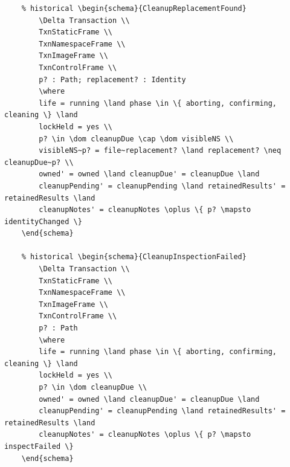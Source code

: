 \documentclass{article}
\begin{document}
\begin{verbatim}
	% historical \begin{schema}{CleanupReplacementFound}
		\Delta Transaction \\
		TxnStaticFrame \\
		TxnNamespaceFrame \\
		TxnImageFrame \\
		TxnControlFrame \\
		p? : Path; replacement? : Identity
		\where
		life = running \land phase \in \{ aborting, confirming, cleaning \} \land
		lockHeld = yes \\
		p? \in \dom cleanupDue \cap \dom visibleNS \\
		visibleNS~p? = file~replacement? \land replacement? \neq cleanupDue~p? \\
		owned' = owned \land cleanupDue' = cleanupDue \land
		cleanupPending' = cleanupPending \land retainedResults' = retainedResults \land
		cleanupNotes' = cleanupNotes \oplus \{ p? \mapsto identityChanged \}
	\end{schema}

	% historical \begin{schema}{CleanupInspectionFailed}
		\Delta Transaction \\
		TxnStaticFrame \\
		TxnNamespaceFrame \\
		TxnImageFrame \\
		TxnControlFrame \\
		p? : Path
		\where
		life = running \land phase \in \{ aborting, confirming, cleaning \} \land
		lockHeld = yes \\
		p? \in \dom cleanupDue \\
		owned' = owned \land cleanupDue' = cleanupDue \land
		cleanupPending' = cleanupPending \land retainedResults' = retainedResults \land
		cleanupNotes' = cleanupNotes \oplus \{ p? \mapsto inspectFailed \}
	\end{schema}


\end{verbatim}
\end{document}
